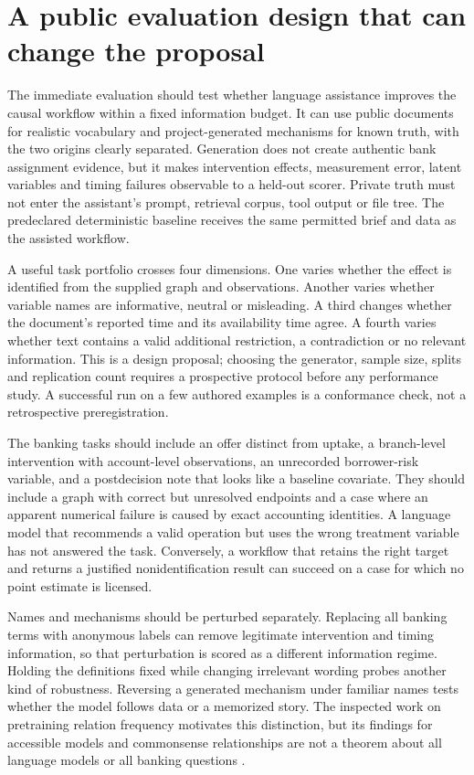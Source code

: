 \section{A public evaluation design that can change the proposal}

The immediate evaluation should test whether language assistance improves the
causal workflow within a fixed information budget. It can use public documents
for realistic vocabulary and project-generated mechanisms for known truth,
with the two origins clearly separated. Generation does not create authentic
bank assignment evidence, but it makes intervention effects, measurement error,
latent variables and timing failures observable to a held-out scorer. Private
truth must not enter the assistant's prompt, retrieval corpus, tool output or
file tree. The predeclared deterministic baseline receives the same permitted
brief and data as the assisted workflow.

A useful task portfolio crosses four dimensions. One varies whether the effect
is identified from the supplied graph and observations. Another varies whether
variable names are informative, neutral or misleading. A third changes whether
the document's reported time and its availability time agree. A fourth varies
whether text contains a valid additional restriction, a contradiction or no
relevant information. This is a design proposal; choosing the generator, sample
size, splits and replication count requires a prospective protocol before any
performance study. A successful run on a few authored examples is a conformance
check, not a retrospective preregistration.

The banking tasks should include an offer distinct from uptake, a branch-level
intervention with account-level observations, an unrecorded borrower-risk
variable, and a postdecision note that looks like a baseline covariate. They
should include a graph with correct but unresolved endpoints and a case where
an apparent numerical failure is caused by exact accounting identities. A
language model that recommends a valid operation but uses the wrong treatment
variable has not answered the task. Conversely, a workflow that retains the
right target and returns a justified nonidentification result can succeed on a
case for which no point estimate is licensed.

Names and mechanisms should be perturbed separately. Replacing all banking
terms with anonymous labels can remove legitimate intervention and timing
information, so that perturbation is scored as a different information regime.
Holding the definitions fixed while changing irrelevant wording probes another
kind of robustness. Reversing a generated mechanism under familiar names tests
whether the model follows data or a memorized story. The inspected work on
pretraining relation frequency motivates this distinction, but its findings
for accessible models and commonsense relationships are not a theorem about
all language models or all banking questions
\citep{v12_la_2407_19638}.

